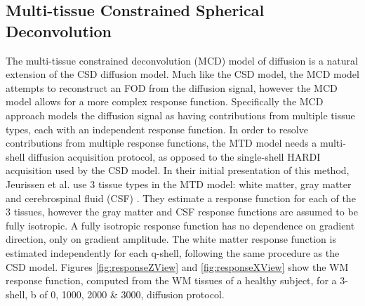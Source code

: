 \subsection{Multi-tissue Constrained Spherical Deconvolution}

The multi-tissue constrained deconvolution (MCD) model of diffusion is a natural extension of the CSD diffusion model. Much like the CSD model, the MCD model attempts to reconstruct an FOD from the diffusion signal, however the MCD model allows for a more complex response function. Specifically the MCD approach models the diffusion signal as having contributions from multiple tissue types, each with an independent response function. In order to resolve contributions from multiple response functions, the MTD model needs a multi-shell diffusion acquisition protocol, as opposed to the single-shell HARDI acquisition used by the CSD model. In their initial presentation of this method, Jeurissen et al. use 3 tissue types in the MTD model: white matter, gray matter and cerebrospinal fluid (CSF) \cite{Jeurissen_2014}. They estimate a response function for each of the 3 tissues, however the gray matter and CSF response functions are assumed to be fully isotropic. A fully isotropic response function has no dependence on gradient direction, only on gradient amplitude. The white matter response function is estimated independently for each q-shell, following the same procedure as the CSD model. Figures \ref{fig:responseZView} and \ref{fig:responseXView} show the WM response function, computed from the WM tissues of a healthy subject, for a 3-shell, b of 0, 1000, 2000 & 3000, diffusion protocol.